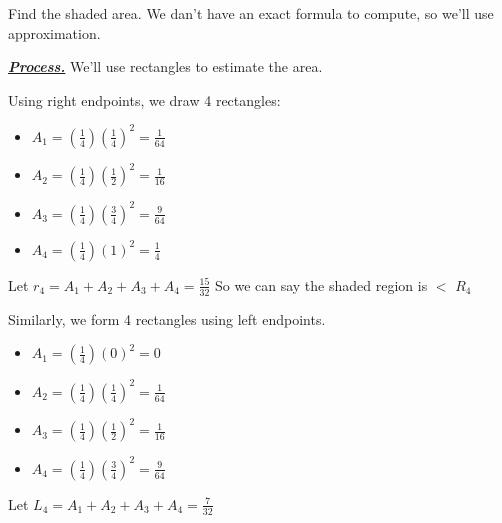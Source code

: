 \documentclass{report}
\begin{document}
\bigbreak \noindent 
\begin{figure}[ht]
    \centering
    \label{fig:curve1}
\end{figure}

\bigbreak \noindent 
Find the shaded area.
\bigbreak \noindent 
We dan't have an exact formula to compute, so we'll use approximation.

\bigbreak \noindent 
\textbf{\textit{\underline{Process.}}}
\smallbreak \noindent \smallbreak \noindent
We'll use rectangles to estimate the area.

\bigbreak \noindent 
\begin{figure}[ht]
    \centering
    \label{fig:curve2}
\end{figure}

\bigbreak \noindent 
Using right endpoints, we draw 4 rectangles:
\begin{itemize}
  \item $A_{1} = (\frac{1}{4})(\frac{1}{4})^{2} = \frac{1}{64} $
  \item $A_{2} =  (\frac{1}{4})(\frac{1}{2})^{2} = \frac{1}{16}$
  \item $A_{3} =  (\frac{1}{4})(\frac{3}{4})^{2} = \frac{9}{64}$
  \item $A_{4} =  (\frac{1}{4})(1)^{2} = \frac{1}{4}$
\end{itemize}
\bigbreak \noindent 
{}
\bigbreak \noindent 
Let $r_{4} = A_{1} + A_{2} + A_{3} + A_{4} = \frac{15}{32}$
\bigbreak \noindent 
So we can say the shaded region is $<$ $R_4$

\bigbreak \noindent \bigbreak \noindent 
Similarly, we form 4 rectangles using left endpoints.

\begin{figure}[ht]
    \centering
    \label{fig:curve3}
\end{figure}

\bigbreak \noindent 
\begin{itemize}
  \item $A_{1} = (\frac{1}{4})(0)^{2} = 0$
  \item $A_{2} = (\frac{1}{4})(\frac{1}{4})^{2} = \frac{1}{64} $
  \item $A_{3} =  (\frac{1}{4})(\frac{1}{2})^{2} = \frac{1}{16}$
  \item $A_{4} = (\frac{1}{4})(\frac{3}{4})^{2}  = \frac{9}{64}$
\end{itemize}
\bigbreak \noindent 
Let $L_{4} = A_{1} +A_{2} +A_{3} +A_{4} = \frac{7}{32}$
\end{document}

